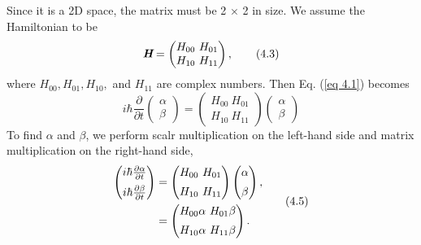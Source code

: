 \documentclass{article}
\begin{document}
Since it is a 2D space, the matrix must be 2 $\times$ 2 in size. We assume the Hamiltonian to be
\begin{equation} \label{eq 4.3}
    \textit{\textbf{H}}=\begin{pmatrix}
        H_{00} \ H_{01}\\
        H_{10} \ H_{11}
    \end{pmatrix}, \tag{4.3}
\end{equation} 
where $H_{00}, H_{01}, H_{10},$ and $H_{11}$  are complex numbers. Then Eq. (\ref{eq 4.1}) becomes
\begin{equation} \label{eq 4.4}
    i\hbar\frac{\partial}{\partial t}\begin{pmatrix}
        \alpha \\  \beta
    \end{pmatrix}=\begin{pmatrix}
        H_{00} \ H_{01}\\
        H_{10} \ H_{11}
    \end{pmatrix}
    \begin{pmatrix}
        \alpha \\ \beta
    \end{pmatrix} \tag{4.4}
\end{equation}
To find $\alpha$ and $\beta$, we perform scalr multiplication on the left-hand side and matrix
multiplication on the right-hand side,
\begin{align} \label{eq 4.5}
    \begin{split}
        \begin{pmatrix}
             i\hbar\frac{\partial \alpha}{\partial t}\\
             \addlinespace
            i\hbar\frac{\partial \beta}{\partial t} \end{pmatrix}
            &=\begin{pmatrix}
                H_{00} \ H_{01}\\ \addlinespace
                H_{10} \ H_{11}
            \end{pmatrix}
            \begin{pmatrix}
                \alpha \\ \addlinespace \beta
            \end{pmatrix},\\
            &=\begin{pmatrix}
                H_{00}\alpha \ H_{01}\beta\\ \addlinespace
                H_{10}\alpha \ H_{11}\beta
            \end{pmatrix}. 
    \end{split} \tag{4.5}
\end{align}
\end{document}
